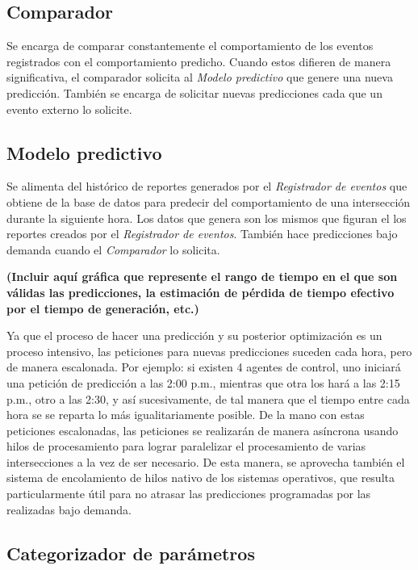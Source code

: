 \hypertarget{comparador}{%
\subsection{Comparador}\label{comparador}}

Se encarga de comparar constantemente el comportamiento de los eventos
registrados con el comportamiento predicho. Cuando estos difieren de
manera significativa, el comparador solicita al \emph{Modelo predictivo}
que genere una nueva predicción. También se encarga de solicitar nuevas
predicciones cada que un evento externo lo solicite.

\hypertarget{modelo-predictivo}{%
\subsection{Modelo predictivo}\label{modelo-predictivo}}

Se alimenta del histórico de reportes generados por el \emph{Registrador
de eventos} que obtiene de la base de datos para predecir del
comportamiento de una intersección durante la siguiente hora. Los datos
que genera son los mismos que figuran el los reportes creados por el
\emph{Registrador de eventos}. También hace predicciones bajo demanda
cuando el \emph{Comparador} lo solicita.

\textbf{(Incluir aquí gráfica que represente el rango de tiempo en el
que son válidas las predicciones, la estimación de pérdida de tiempo
efectivo por el tiempo de generación, etc.)}

Ya que el proceso de hacer una predicción y su posterior optimización es
un proceso intensivo, las peticiones para nuevas predicciones suceden
cada hora, pero de manera escalonada. Por ejemplo: si existen 4 agentes
de control, uno iniciará una petición de predicción a las 2:00 p.m.,
mientras que otra los hará a las 2:15 p.m., otro a las 2:30, y así
sucesivamente, de tal manera que el tiempo entre cada hora se se reparta
lo más igualitariamente posible. De la mano con estas peticiones
escalonadas, las peticiones se realizarán de manera asíncrona usando
hilos de procesamiento para lograr paralelizar el procesamiento de
varias intersecciones a la vez de ser necesario. De esta manera, se
aprovecha también el sistema de encolamiento de hilos nativo de los
sistemas operativos, que resulta particularmente útil para no atrasar
las predicciones programadas por las realizadas bajo demanda.

\hypertarget{categorizador-de-paruxe1metros}{%
\subsection{Categorizador de
parámetros}\label{categorizador-de-paruxe1metros}}

